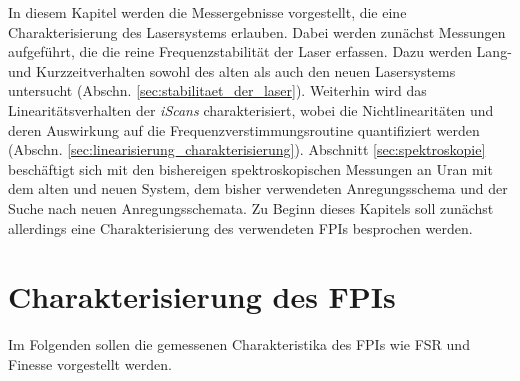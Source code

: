 In diesem Kapitel werden die Messergebnisse vorgestellt, die eine
Charakterisierung des Lasersystems erlauben. Dabei werden zunächst Messungen
aufgeführt, die die reine Frequenzstabilität der Laser erfassen. Dazu werden
Lang- und Kurzzeitverhalten sowohl des alten als auch den neuen Lasersystems
untersucht (Abschn. \ref{sec:stabilitaet_der_laser}). Weiterhin wird das
Linearitätsverhalten der \textit{iScans} charakterisiert, wobei die
Nichtlinearitäten und deren Auswirkung auf die
Frequenzverstimmungsroutine quantifiziert werden (Abschn.
\ref{sec:linearisierung_charakterisierung}). Abschnitt \ref{sec:spektroskopie} beschäftigt
sich mit den bishereigen spektroskopischen Messungen an Uran mit dem alten und
neuen System, dem bisher verwendeten Anregungsschema und der Suche nach neuen
Anregungsschemata.
Zu Beginn dieses Kapitels soll zunächst allerdings eine Charakterisierung
des verwendeten FPIs besprochen werden.

\section{Charakterisierung des FPIs}\label{sec:charakterisierung_FPI}
Im Folgenden sollen die gemessenen Charakteristika des FPIs wie FSR und Finesse
vorgestellt werden.

